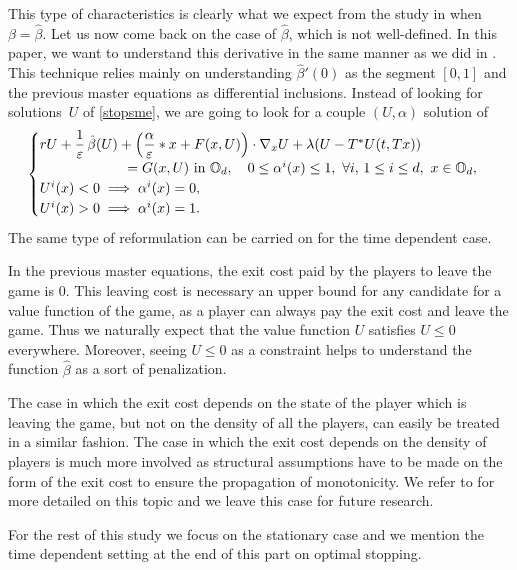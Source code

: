 \documentclass[10pt]{amsart}
\let\epsilon\varepsilon
\theoremstyle{definition}
\begin{document}
This type of characteristics is clearly what we expect from the study in \cite{bertucci2018optimal} when $\beta = \hat{\beta}$. Let us now come back on the case of $\hat{\beta}$, which is not well-defined. In this paper, we want to understand this derivative in the same manner as we did in \cite{bertucci2018optimal}. This technique relies mainly on understanding $\hat{\beta}'(0)$ as the segment $[0,1]$ and the previous master equations as differential inclusions. Instead of looking for solutions~$U$ of \eqref{stopsme}, we are going to look for a couple $(U,\alpha)$ solution of
\begin{equation}\label{stopsme}
\begin{cases}
r U+\dfrac{1}{\epsilon}\,\hat{\beta}(U)+\Bigl(\dfrac{\alpha}{\epsilon}*x+F(x,U)\Bigr)\cdot \nabla_xU+\lambda (U-T^*U(t,Tx))\\
\hspace*{2.2cm}= G(x,U) \text{ in } \mathbb{O}_d,\quad
0 \leq \alpha^i(x) \leq 1,\ \forall i,\, 1 \leq i \leq d,\ x \in \mathbb{O}_d,\\
U^i(x) < 0 \implies \alpha^i(x) = 0,\\
U^i(x) > 0 \implies \alpha^i(x) = 1.
\end{cases}
\end{equation}
The same type of reformulation can be carried on for the time dependent case.

In the previous master equations, the exit cost paid by the players to leave the game is $0$. This leaving cost is necessary an upper bound for any candidate for a value function of the game, as a player can always pay the exit cost and leave the game. Thus we naturally expect that the value function $U$ satisfies $U \leq 0$ everywhere. Moreover, seeing $U \leq 0$ as a constraint helps to understand the function $\hat{\beta}$ as a sort of penalization.

The case in which the exit cost depends on the state of the player which is leaving the game, but not on the density of all the players, can easily be treated in a similar fashion. The case in which the exit cost depends on the density of players is much more involved as structural assumptions have to be made on the form of the exit cost to ensure the propagation of monotonicity. We refer to \cite{bertucci2018optimal} for more detailed on this topic and we leave this case for future research.

For the rest of this study we focus on the stationary case and we mention the time dependent setting at the end of this part on optimal stopping.
\end{document}
